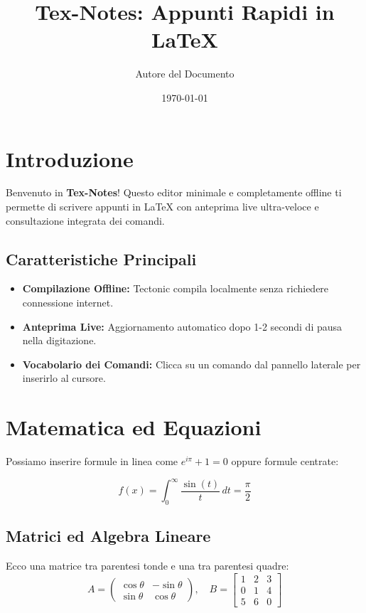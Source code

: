 \documentclass[11pt,a4paper]{article}
\title{\textbf{Tex-Notes}: Appunti Rapidi in \LaTeX}
\author{Autore del Documento}
\date{\today}
\begin{document}
\maketitle

\section{Introduzione}
Benvenuto in \textbf{Tex-Notes}! Questo editor minimale e completamente offline ti permette di scrivere appunti in \LaTeX{} con anteprima live ultra-veloce e consultazione integrata dei comandi.

\subsection{Caratteristiche Principali}
\begin{itemize}
    \item \textbf{Compilazione Offline:} Tectonic compila localmente senza richiedere connessione internet.
    \item \textbf{Anteprima Live:} Aggiornamento automatico dopo 1-2 secondi di pausa nella digitazione.
    \item \textbf{Vocabolario dei Comandi:} Clicca su un comando dal pannello laterale per inserirlo al cursore.
\end{itemize}

\section{Matematica ed Equazioni}
Possiamo inserire formule in linea come $e^{i\pi} + 1 = 0$ oppure formule centrate:

\begin{equation}
    f(x) = \int_{0}^{\infty} \frac{\sin(t)}{t} \, dt = \frac{\pi}{2}
\end{equation}

\subsection{Matrici ed Algebra Lineare}
Ecco una matrice tra parentesi tonde e una tra parentesi quadre:
\begin{equation*}
    A = \begin{pmatrix}
        \cos\theta & -\sin\theta \\
        \sin\theta &  \cos\theta
    \end{pmatrix}, \quad
    B = \begin{bmatrix}
        1 & 2 & 3 \\
        0 & 1 & 4 \\
        5 & 6 & 0
    \end{bmatrix}
\end{equation*}
\end{document}
